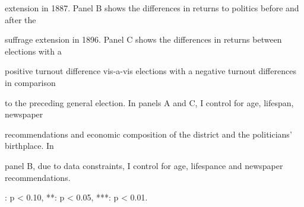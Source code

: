 \begin{table}[!h]
{\begin{threeparttable}
\begin{tablenotes}[para]
\item extension in 1887. Panel B shows the differences in returns to politics before and after the
\item suffrage extension in 1896.  Panel C shows the differences in returns between elections with a
\item positive turnout difference vis-a-vis elections with a negative turnout differences in comparison
\item to the preceding general election. In panels A and C, I control for age, lifespan, newspaper
\item recommendations and economic composition of the district and the politicians' birthplace. In
\item panel B, due to data constraints, I control for age, lifespance and newspaper recommendations.
\item *: p < 0.10, **: p < 0.05, ***: p < 0.01.
\end{tablenotes}
\end{threeparttable}}
\end{table}
